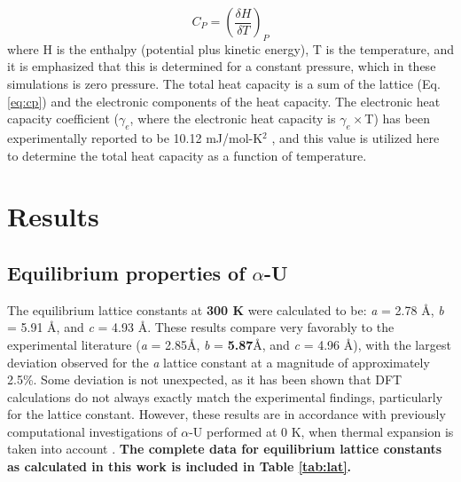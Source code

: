 \documentclass[utf8]{frontiersSCNS} %
\providecommand{\DIFaddtex}[1]{{\bf #1}} %
\providecommand{\DIFdeltex}[1]{} %
\providecommand{\DIFaddbegin}{\protect\color{blue}} %
\providecommand{\DIFaddend}{\protect\color{black}} %
\providecommand{\DIFdelbegin}{\protect\color{red}} %
\providecommand{\DIFdelend}{\protect\color{black}} %
\providecommand{\DIFadd}[1]{\texorpdfstring{\DIFaddtex{#1}}{#1}} %
\providecommand{\DIFdel}[1]{\texorpdfstring{\DIFdeltex{#1}}{}} %
\begin{document}
\begin{equation}
\label{eq:cp}
C_{P} = \left(\frac{\delta H}{\delta T}\right)_{P}
\end{equation}where H is the enthalpy (potential plus kinetic energy), T is the temperature, and it is emphasized that this is determined for a constant pressure, which in these simulations is zero pressure. The total heat capacity is a sum of the lattice (Eq. \ref{eq:cp}) and the electronic components of the heat capacity. The electronic heat capacity coefficient ($\gamma_e$, where the electronic heat capacity is $\gamma_e\times$T) has been experimentally reported to be 10.12 mJ/mol-K$^2$ \cite{marchidan1976, schachinger1989} , and this value is utilized here to determine the total heat capacity as a function of temperature. 

\section{Results}

\subsection{Equilibrium properties of $\alpha$-U}

The equilibrium lattice constants at \DIFdelbegin \DIFdel{room temperature }\DIFdelend \DIFaddbegin \DIFadd{300 K }\DIFaddend were calculated to be: \textit{a} = 2.78 \AA, \textit{b} = 5.91 \AA, and \textit{c} = 4.93 \AA. These results compare very favorably to the experimental literature (\textit{a} = 2.85\AA, \textit{b} = \DIFdelbegin \DIFdel{5.86}\DIFdelend \DIFaddbegin \DIFadd{5.87}\DIFaddend \AA, and \textit{c} = 4.96 \AA \cite{lawson1988}), with the largest deviation observed for the \textit{a} lattice constant at a magnitude of approximately 2.5\%. Some deviation is not unexpected, as it has been shown that DFT calculations do not always exactly match the experimental findings, particularly for the lattice constant. However, these results are in accordance with previously computational investigations of $\alpha$-U performed at 0 K, when thermal expansion is taken into account \cite{wirth2011,beeler2013}. \DIFaddbegin \DIFadd{The complete data for equilibrium lattice constants as calculated in this work is included in Table \ref{tab:lat}. 
}\DIFaddend 
\end{document}
